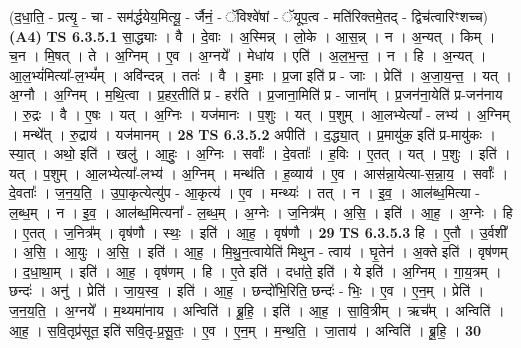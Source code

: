 \documentclass[17pt]{extarticle}
\begin{document}
                  \newline
                      (द॒धा॒ति॒ - प्रत्यृ॒ - चा - सम॑र्द्धयेय॒मित्यू॒ - र्जैनं॒ - ॅविश्वे॑षां - ॅयूप॒त्व - मति॑रिक्तमे॒तद् - द्विच॑त्वारिꣳशच्च)  \textbf{(A4)} \newline \newline
                                \textbf{ TS 6.3.5.1} \newline
                  सा॒द्ध्याः । वै । दे॒वाः । अ॒स्मिन्न् । लो॒के । आ॒स॒न्न् । न । अ॒न्यत् । किम् । च॒न । मि॒षत् । ते । अ॒ग्निम् । ए॒व । अ॒ग्नये᳚ । मेधा॑य । एति॑ । अ॒ल॒भ॒न्त॒ । न । हि । अ॒न्यत् । आ॒ल॒भ्यं॑मित्या᳚-ल॒भ्यं᳚म् । अवि॑न्दन्न् । ततः॑ । वै । इ॒माः । प्र॒जा इति॑ प्र - जाः । प्रेति॑ । अ॒जा॒य॒न्त॒ । यत् । अ॒ग्नौ । अ॒ग्निम् । म॒थि॒त्वा । प्र॒हर॒तीति॑ प्र - हर॑ति । प्र॒जाना॒मिति॑ प्र - जाना᳚म् । प्र॒जन॑ना॒येति॑ प्र-जन॑नाय । रु॒द्रः । वै । ए॒षः । यत् । अ॒ग्निः । यज॑मानः । प॒शुः । यत् । प॒शुम् । आ॒लभ्येत्या᳚ - लभ्य॑ । अ॒ग्निम् । मन्थे᳚त् । रु॒द्राय॑ । यज॑मानम् । \textbf{  28} \newline
                  \newline
                                \textbf{ TS 6.3.5.2} \newline
                  अपीति॑ । द॒द्ध्या॒त् । प्र॒मायु॑क॒ इति॑ प्र-मायु॑कः । स्या॒त् । अथो॒ इति॑ । खलु॑ । आ॒हुः॒ । अ॒ग्निः । सर्वाः᳚ । दे॒वताः᳚ । ह॒विः । ए॒तत् । यत् । प॒शुः । इति॑ । यत् । प॒शुम् । आ॒लभ्येत्या᳚-लभ्य॑ । अ॒ग्निम् । मन्थ॑ति । ह॒व्याय॑ । ए॒व । आस॑न्ना॒येत्या-स॒न्ना॒य॒ । सर्वाः᳚ । दे॒वताः᳚ । ज॒न॒य॒ति॒ । उ॒पा॒कृत्येत्यु॑प - आ॒कृत्य॑ । ए॒व । मन्थ्यः॑ । तत् । न । इ॒व॒ । आल॑ब्ध॒मित्या - ल॒ब्ध॒म् । न । इ॒व॒ । आल॑ब्ध॒मित्यना᳚ - ल॒ब्ध॒म् । अ॒ग्नेः । ज॒नित्र᳚म् । अ॒सि॒ । इति॑ । आ॒ह॒ । अ॒ग्नेः । हि । ए॒तत् । ज॒नित्र᳚म् । वृष॑णौ । स्थः॒ । इति॑ । आ॒ह॒ । वृष॑णौ । \textbf{  29} \newline
                  \newline
                                \textbf{ TS 6.3.5.3} \newline
                  हि । ए॒तौ । उ॒र्वशी᳚ । अ॒सि॒ । आ॒युः । अ॒सि॒ । इति॑ । आ॒ह॒ । मि॒थु॒न॒त्वायेति॑ मिथुन - त्वाय॑ । घृ॒तेन॑ । अ॒क्ते इति॑ । वृष॑णम् । द॒धा॒था॒म् । इति॑ । आ॒ह॒ । वृष॑णम् । हि । ए॒ते इति॑ । दधा॑ते॒ इति॑ । ये इति॑ । अ॒ग्निम् । गा॒य॒त्रम् । छन्दः॑ । अनु॑ । प्रेति॑ । जा॒य॒स्व॒ । इति॑ । आ॒ह॒ । छन्दो॑भि॒रिति॒ छन्दः॑ - भिः॒ । ए॒व । ए॒न॒म् । प्रेति॑ । ज॒न॒य॒ति॒ । अ॒ग्नये᳚ । म॒थ्यमा॑नाय । अन्विति॑ । ब्रू॒हि॒ । इति॑ । आ॒ह॒ । सा॒वि॒त्रीम् । ऋच᳚म् । अन्विति॑ । आ॒ह॒ । स॒वि॒तृप्र॑सूत॒ इति॑ सवि॒तृ-प्र॒सू॒तः॒ । ए॒व । ए॒न॒म् । म॒न्थ॒ति॒ । जा॒ताय॑ । अन्विति॑ । ब्रू॒हि॒ । \textbf{  30} \newline
\end{document}
